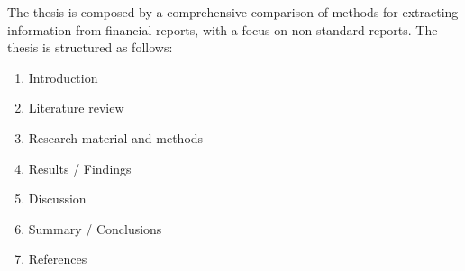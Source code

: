 \documentclass[english, 12pt, a4paper, elec, utf8, a-2b, online]{aaltothesis}
\begin{document}
The thesis is composed by a comprehensive comparison of methods for extracting information from financial reports, with a focus on non-standard reports. The thesis is structured as follows:

\begin{enumerate}
	\item \label{list:intro} Introduction
	\item Literature review
	\item Research material and methods
	\item Results / Findings
	\item Discussion
	\item \label{list:summary} Summary / Conclusions
	\item References
\end{enumerate}
\end{document}
